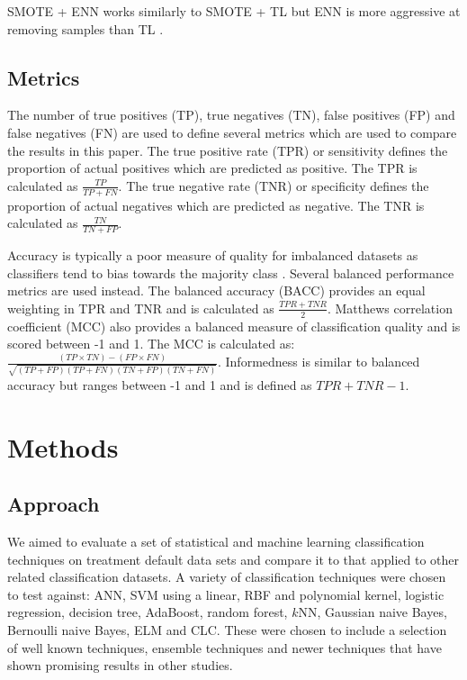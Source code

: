 \documentclass{sig-alternate-05-2015}
\begin{document}
	SMOTE + ENN works similarly to SMOTE + TL but ENN is more aggressive at removing samples than TL \cite{Batista:2004:SBS:1007730.1007735}.
	
	\subsection{Metrics}
	The number of true positives (TP), true negatives (TN), false positives (FP) and false negatives (FN) are used to define several metrics which are used to compare the results in this paper. The true positive rate (TPR) or sensitivity defines the proportion of actual positives which are predicted as positive. The TPR is calculated as $\frac{TP}{TP + FN}$. The true negative rate (TNR) or specificity defines the proportion of actual negatives which are predicted as negative. The TNR is calculated as $\frac{TN}{TN + FP}$. 
	
	Accuracy is typically a poor measure of quality for imbalanced datasets as classifiers tend to bias towards the majority class \cite{Batista:2004:SBS:1007730.1007735, Chawla:2004:ESI:1007730.1007733}. Several balanced performance metrics are used instead. The balanced accuracy (BACC) provides an equal weighting in TPR and TNR and is calculated as $\frac{TPR + TNR}{2}$. Matthews correlation coefficient (MCC) also provides a balanced measure of classification quality and is scored between -1 and 1. The MCC is calculated as: $\frac{(TP \times TN) - (FP \times FN)}{\sqrt{(TP + FP)(TP + FN)(TN + FP)(TN + FN)}}$. Informedness is similar to balanced accuracy but ranges between -1 and 1 and is defined as $TPR + TNR - 1$.
	
	
	\section{Methods}
	\subsection{Approach}
	We aimed to evaluate a set of statistical and machine learning classification techniques on treatment default data sets and compare it to that applied to other related classification datasets. A variety of classification techniques were chosen to test against: ANN, SVM using a linear, RBF and polynomial kernel, logistic regression, decision tree, AdaBoost, random forest, $k$NN, Gaussian naive Bayes, Bernoulli naive Bayes, ELM and CLC. These were chosen to include a selection of well known techniques, ensemble techniques and newer techniques that have shown promising results in other studies. 
	
\end{document}
